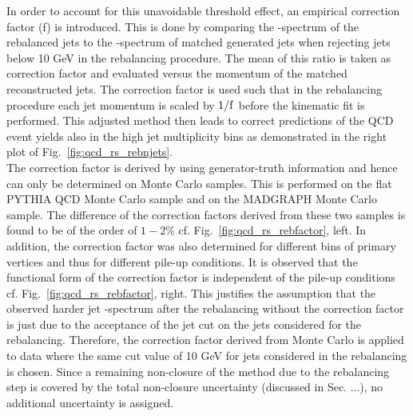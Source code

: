 In order to account for this unavoidable threshold effect, an empirical correction factor (f) is introduced. This is done by comparing the \pt-spectrum of the rebalanced jets to the \pt-spectrum of matched generated jets when rejecting jets below 10 GeV in the rebalancing procedure. The mean of this ratio is taken as correction factor and evaluated versus the momentum of the matched reconstructed jets. The correction factor is used such that in the rebalancing procedure each jet momentum is scaled by $1/\rm{f}$ before the kinematic fit is performed. This adjusted method then leads to correct predictions of the QCD event yields also in the high jet multiplicity bins as demonstrated in the right plot of Fig.~\ref{fig:qcd_rs_rebnjets}.\\
The correction factor is derived by using generator-truth information and hence can only be determined on Monte Carlo samples. This is performed on the flat PYTHIA QCD Monte Carlo sample and on the MADGRAPH Monte Carlo sample. The difference of the correction factors derived from these two samples is found to be of the order of $1-2\%$ cf. Fig.~\ref{fig:qcd_rs_rebfactor}, left. In addition, the correction factor was also determined for different bins of primary vertices and thus for different pile-up conditions. It is observed that the functional form of the correction factor is independent of the pile-up conditions cf. Fig.~\ref{fig:qcd_rs_rebfactor}, right. This justifies the assumption that the observed harder jet \pt-spectrum after the rebalancing without the correction factor is just due to the acceptance of the jet \pt cut on the jets considered for the rebalancing. Therefore, the correction factor derived from Monte Carlo is applied to data where the same \pt cut value of 10 GeV for jets considered in the rebalancing is chosen. Since a remaining non-closure of the method due to the rebalancing step is covered by the total non-closure uncertainty (discussed in Sec. ...), no additional uncertainty is assigned. 

